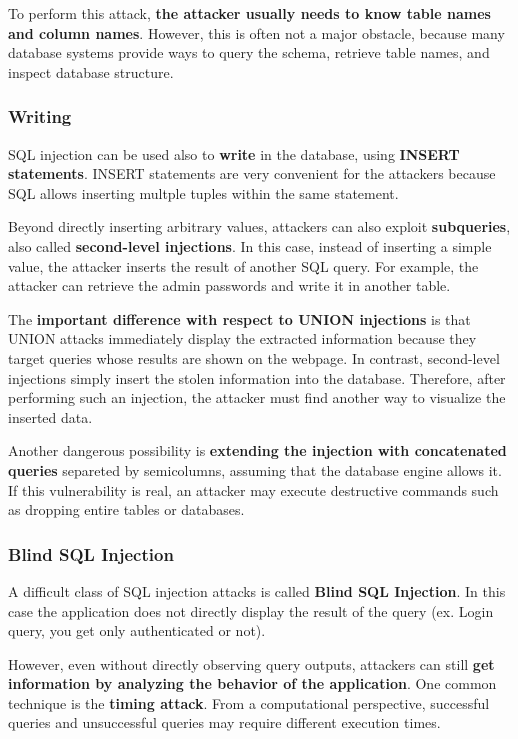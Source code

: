 \documentclass{article}
\begin{document}
To perform this attack, \textbf{the attacker usually needs to know table names and column names}. However, this is often not a major obstacle, because many database systems provide ways to query the schema, retrieve table names, and inspect database structure.

\subsubsection{Writing}

SQL injection can be used also to \textbf{write} in the database, using \textbf{INSERT statements}. INSERT statements are very convenient for the attackers because SQL allows inserting multple tuples within the same statement.

Beyond directly inserting arbitrary values, attackers can also exploit \textbf{subqueries}, also called \textbf{second-level injections}. In this case, instead of inserting a simple value, the attacker inserts the result of another SQL query. For example, the attacker can retrieve the admin passwords and write it in another table.

The \textbf{important difference with respect to UNION injections} is that UNION attacks immediately display the extracted information because they target queries whose results are shown on the webpage. In contrast, second-level injections simply insert the stolen information into the database. Therefore, after performing such an injection, the attacker must find another way to visualize the inserted data.

Another dangerous possibility is \textbf{extending the injection with concatenated queries} separeted by semicolumns, assuming that the database engine allows it. If this vulnerability is real, an attacker may execute destructive commands such as dropping entire tables or databases.

\subsubsection{Blind SQL Injection}

A difficult class of SQL injection attacks is called \textbf{Blind SQL Injection}. In this case the application does not directly display the result of the query (ex. Login query, you get only authenticated or not).

However, even without directly observing query outputs, attackers can still \textbf{get information by analyzing the behavior of the application}. One common technique is the \textbf{timing attack}. From a computational perspective, successful queries and unsuccessful queries may require different execution times.
\end{document}
